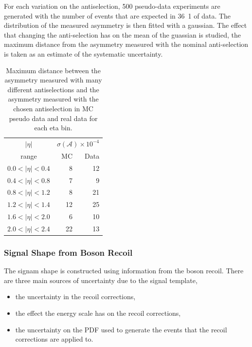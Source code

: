 For each variation on the antiselection, 500 pseudo-data experiments are
generated with the number of events that are expected in \unit{36.1}{\invpb} of
data. The distribution of the measured asymmetry is then fitted with a
gaussian.
The effect that changing the anti-selection has on the mean of the guassian is
studied, the maximum distance from the asymmetry measured with the nominal
anti-selection is taken as an estimate of the systematic uncertainty.

\begin{table}[htb]
\begin{center}
\begin{tabular}{crr}
$|\eta|$  &\multicolumn{2}{c}{ $\sigma(\mathcal{A}) \times 10^{-4}$}\\
   range      & MC & Data\\
\hline
$0.0<|\eta|<0.4$ & 8 & 12\\
$0.4<|\eta|<0.8$ & 7 & 9\\
$0.8<|\eta|<1.2$ & 8 & 21\\
$1.2<|\eta|<1.4$ & 12& 25\\
$1.6<|\eta|<2.0$ & 6 & 10\\
$2.0<|\eta|<2.4$ & 22& 13\\
\end{tabular}
\caption{Maximum distance between the asymmetry measured with many different antiselections
and the asymmetry measured with the chosen antiselection in MC pseudo data and real data for each eta bin.}
\label{tab:systQCD}
\end{center}
\end{table}


\subsubsection{Signal \ETm Shape from Boson Recoil}

The signam \ETm shape is constructed using information from the boson recoil.
There are three main sources of uncertainty due to the signal template,

\begin{itemize}
    \item the uncertainty in the recoil corrections,
    \item the effect the energy scale has on the recoil corrections,
    \item the uncertainty on the \ac{PDF} used to generate the events that the
recoil corrections are applied to.
\end{itemize}

